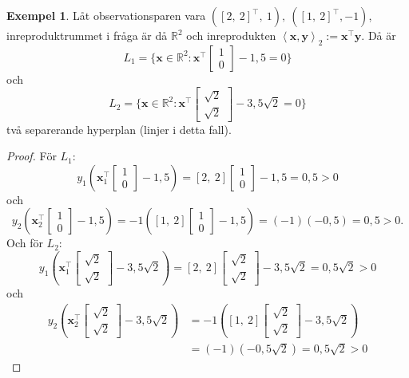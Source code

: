 \documentclass[a4paper, 12pt]{report}
\theoremstyle{definition}
\newtheorem{ex}{Exempel}[section]
\theoremstyle{remark}
\newcommand{\bfx}{\mathbf{x}}
\newcommand{\llangle}{\left\langle}
\newcommand{\rrangle}{\right\rangle}
\newcommand{\inner}[2]{\llangle #1, #2 \rrangle}
\begin{document}
\begin{ex}\label{exempel:mångahyperplan}%
	Låt observationsparen vara $\left(\left[2,~2\right]^\intercal\!,~1\right),~\left(\left[1,~2\right]^\intercal\!,-1\right)$, inreproduktrummet i fråga är då $\mathbb{R}^2$ och inreprodukten $\inner{\bfx}{\mathbf{y}}_2:=\bfx^\intercal\mathbf{y}$. Då är $$L_1=\{\mathbf{x}\in\mathbb{R}^2: \mathbf{x}^\intercal\begin{bmatrix}
	1\\
	0
	\end{bmatrix} - 1,5=0\}$$ och $$L_2=\{\mathbf{x}\in\mathbb{R}^2: \mathbf{x}^\intercal\begin{bmatrix}
	\sqrt{2}\\
	\sqrt{2}
	\end{bmatrix} - 3,5\sqrt{2}=0\}$$ två separerande hyperplan (linjer i detta fall).
\end{ex}
\begin{proof}
	För $L_1$: $$y_1\left(\mathbf{x}_1^\intercal\begin{bmatrix}
	1\\
	0\end{bmatrix}-1,5\right)=\left[2,~2\right]\begin{bmatrix}
	1\\
	0\end{bmatrix}-1,5=0,5>0$$ och $$y_2\left(\mathbf{x}_2^\intercal\begin{bmatrix}
	1\\
	0\end{bmatrix}-1,5\right)=-1\left(\left[1,~2\right]\begin{bmatrix}
	1\\
	0\end{bmatrix}-1,5\right)=\left(-1\right)\left(-0,5\right)=0,5>0.$$
	Och för $L_2$: $$y_1\left(\mathbf{x}_1^\intercal\begin{bmatrix}
	\sqrt{2}\\
	\sqrt{2}\end{bmatrix}-3,5\sqrt{2}\right)=\left[2,~2\right]\begin{bmatrix}
	\sqrt{2}\\
	\sqrt{2}\end{bmatrix}-3,5\sqrt{2}=0,5\sqrt{2}>0$$ och
	\begin{align*}
	y_2\left(\mathbf{x}_2^\intercal\begin{bmatrix}
	\sqrt{2}\\
	\sqrt{2}\end{bmatrix}-3,5\sqrt{2}\right)&=-1\left(\left[1,~2\right]\begin{bmatrix}
	\sqrt{2}\\
	\sqrt{2}\end{bmatrix}-3,5\sqrt{2}\right)\\
	&=\left(-1\right)\left(-0,5\sqrt{2}\right)=0,5\sqrt{2}>0
	\end{align*}
\end{proof}
\end{document}
